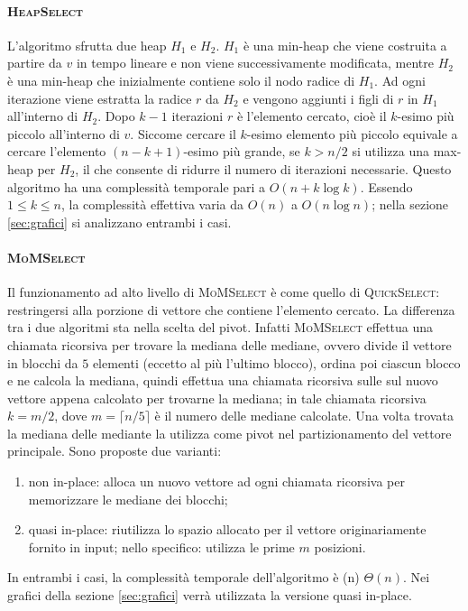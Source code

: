 \documentclass[a4paper,12pt]{article}
\newcommand{\QuickSelect}{\textsc{QuickSelect}}
\newcommand{\HeapSelect}{\textsc{HeapSelect}}
\newcommand{\MoMSelect}{\textsc{MoMSelect}}
\newcommand{\Tlin}{\ifmmode \Theta(n) \else $\Theta(n)$\fi} %
\begin{document}
\paragraph{\HeapSelect}
L'algoritmo sfrutta due heap $H_1$ e $H_2$.
$H_1$ è una min-heap che viene costruita a partire da $v$ in tempo lineare e non viene successivamente modificata, mentre $H_2$ è una min-heap che inizialmente contiene solo il nodo radice di $H_1$.
Ad ogni iterazione viene estratta la radice $r$ da $H_2$ e vengono aggiunti i figli di $r$ in $H_1$ all'interno di $H_2$.
Dopo $k-1$ iterazioni $r$ è l'elemento cercato, cioè il $k$-esimo più piccolo all'interno di $v$.
Siccome cercare il $k$-esimo elemento più piccolo equivale a cercare l'elemento $(n-k+1)$-esimo più grande, se $k>n/2$ si utilizza una max-heap per $H_2$, il che consente di ridurre il numero di iterazioni necessarie.
Questo algoritmo ha una complessità temporale pari a $O(n+k\log k)$.
Essendo $1 \le k \le n$, la complessità effettiva varia da $O(n)$ a $O(n\log n)$; nella sezione \ref{sec:grafici} si analizzano entrambi i casi.

\paragraph{\MoMSelect}
Il funzionamento ad alto livello di \MoMSelect{} è come quello di \QuickSelect: restringersi alla porzione di vettore che contiene l'elemento cercato.
La differenza tra i due algoritmi sta nella scelta del pivot.
Infatti \MoMSelect{} effettua una chiamata ricorsiva per trovare la mediana delle mediane, ovvero divide il vettore in blocchi da $5$ elementi (eccetto al più l'ultimo blocco), ordina poi ciascun blocco e ne calcola la mediana, quindi effettua una chiamata ricorsiva sulle sul nuovo vettore appena calcolato per trovarne la mediana; in tale chiamata ricorsiva $k=m/2$, dove $m=\lceil n/5\rceil$ è il numero delle mediane calcolate.
Una volta trovata la mediana delle mediante la utilizza come pivot nel partizionamento del vettore principale.
Sono proposte due varianti:
\begin{enumerate}
    \item non in-place: alloca un nuovo vettore ad ogni chiamata ricorsiva per memorizzare le mediane dei blocchi;
    \item quasi in-place: riutilizza lo spazio allocato per il vettore originariamente fornito in input; nello specifico: utilizza le prime $m$ posizioni.
\end{enumerate}
In entrambi i casi, la complessità temporale dell'algoritmo è \Tlin{}.
Nei grafici della sezione \ref{sec:grafici} verrà utilizzata la versione quasi in-place.
\end{document}
